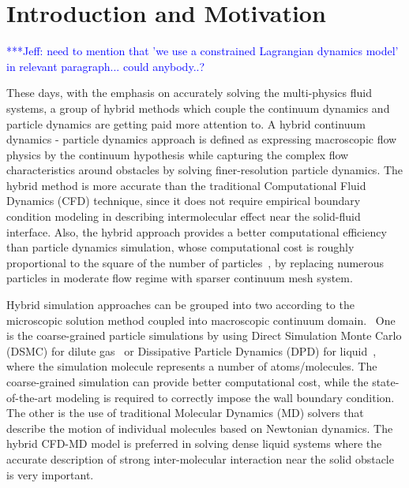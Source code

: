 \documentclass[preprint,12pt]{elsarticle}
\newcommand{\skonote}[1]{ {\textcolor{blue} { ***Jeff: #1 }}}
\newcommand{\skonote}[1]{}
\begin{document}




\section{Introduction and Motivation}

\skonote{need to mention that 'we use a constrained Lagrangian dynamics model' in relevant paragraph... could anybody..?}


These days, with the emphasis on accurately solving the multi-physics fluid systems, a group of hybrid methods which couple the continuum dynamics and particle dynamics are getting paid more attention to. A hybrid continuum dynamics - particle dynamics approach is defined as expressing macroscopic flow physics by the continuum hypothesis while capturing the complex flow characteristics around obstacles by solving finer-resolution particle dynamics. The hybrid method is more accurate than the traditional Computational Fluid Dynamics (CFD) technique, since it does not require empirical boundary condition modeling in describing intermolecular effect near the solid-fluid interface. Also, the hybrid approach provides a better computational efficiency than particle dynamics simulation, whose computational cost is roughly proportional to the square of the number of particles~\cite{Allen}, by replacing numerous particles in moderate flow regime with sparser continuum mesh system.

Hybrid simulation approaches can be grouped into two according to the microscopic solution method coupled into macroscopic continuum domain.~\cite{Koumoutsakos} One is the coarse-grained particle simulations by using Direct Simulation Monte Carlo (DSMC) for dilute gas~\cite{Garcia,Sun} or Dissipative Particle Dynamics (DPD) for liquid~\cite{Fedosov1,Fedosov2}, where the simulation molecule represents a number of atoms/molecules. The coarse-grained simulation can provide better computational cost, while the state-of-the-art modeling is required to correctly impose the wall boundary condition. The other is the use of traditional Molecular Dynamics (MD) solvers that describe the motion of individual molecules based on Newtonian dynamics. The hybrid CFD-MD model is preferred in solving dense liquid systems where the accurate description of strong inter-molecular interaction near the solid obstacle is very important.
\end{document}
